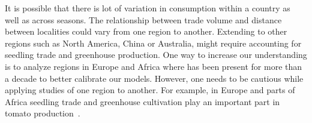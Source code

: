 


It is possible that there
is lot of variation in consumption within a country as well as across
seasons. The relationship between trade volume and distance between
localities could vary from one region to another. Extending to other
regions such as North America, China or Australia, might require accounting
for seedling trade and greenhouse production.
One way to increase our understanding
is to analyze regions in Europe and Africa where \tuta{} has been present
for more than a decade to better calibrate our models. However, one needs
to be cautious while applying studies of one region to another. For
example, in Europe and parts of Africa seedling trade and greenhouse
cultivation play an important part in tomato production~\cite{}. 

